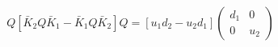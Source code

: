 \begin{equation}
Q[\bar{K}_2 Q \bar{K}_1 - \bar{K}_1 Q \bar{K}_2]Q= [u_1 d_2-u_2 d_1] \left( \begin{array}{cc}
d_1  & 0  \\
0  & u_2
\end{array}  \right)
\end{equation}

